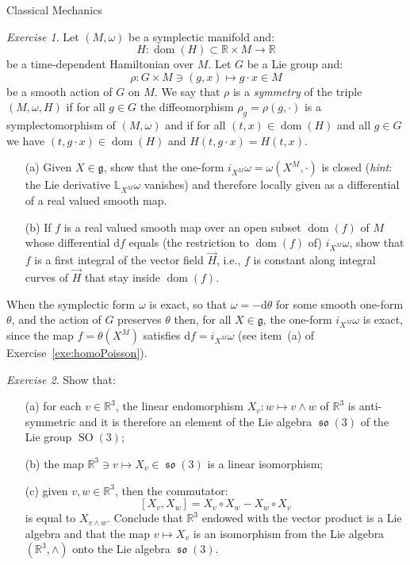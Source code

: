 \documentclass[oneside,a4paper,11pt]{amsbook}
\newcommand{\R}{\mathds R}
\newcommand{\dd}{\mathrm d}
\DeclareMathOperator{\SO}{SO}
\DeclareMathOperator{\so}{\mathfrak{so}}
\DeclareMathOperator{\Dom}{dom}
\theoremstyle{remark}\newtheorem{exercise}{Exercise}[chapter]
\theoremstyle{plain}\newtheorem{teo}{Theorem}[section]
\theoremstyle{plain}\newtheorem{lem}[teo]{Lemma}
\theoremstyle{plain}\newtheorem{prop}[teo]{Proposition}
\theoremstyle{plain}\newtheorem{cor}[teo]{Corollary}
\theoremstyle{definition}\newtheorem{defin}[teo]{Definition}
\theoremstyle{remark}\newtheorem{rem}[teo]{Remark}
\theoremstyle{definition}\newtheorem{notation}[teo]{Notation}
\theoremstyle{definition}\newtheorem{convention}[teo]{Convention}
\theoremstyle{definition}\newtheorem{example}[teo]{Example}
\numberwithin{section}{chapter}
\numberwithin{equation}{section}
\begin{document}
\begin{chapter}{Classical Mechanics}
\begin{exercise}\label{exe:Nother}
Let $(M,\omega)$ be a symplectic manifold and:
\[H:\Dom(H)\subset\R\times M\longrightarrow\R\]
be a time-dependent Hamiltonian over $M$. Let $G$ be a Lie group
and:
\[\rho:G\times M\ni(g,x)\longmapsto g\cdot x\in M\]
be a smooth action of $G$ on $M$. We say that $\rho$ is a {\em symmetry\/} of the triple $(M,\omega,H)$ if for
all $g\in G$ the diffeomorphism $\rho_g=\rho(g,\cdot)$ is a symplectomorphism of $(M,\omega)$ and if for all $(t,x)\in\Dom(H)$ and all $g\in G$ we have
$(t,g\cdot x)\in\Dom(H)$ and $H(t,g\cdot x)=H(t,x)$.
\begin{itemize}
\item[(a)] Given $X\in\mathfrak g$, show that the one-form $i_{X^{\!M}}\omega=\omega(X^{\!M},\cdot)$ is closed
({\em hint}: the Lie derivative $\mathbb L_{X^{\!M}}\omega$ vanishes)
and therefore locally given as a differential of a real valued smooth map.
\item[(b)] If $f$ is a real valued smooth map over an open subset $\Dom(f)$ of $M$ whose differential $\dd f$ equals (the restriction to $\Dom(f)$ of)
$i_{X^{\!M}}\omega$, show that $f$ is a first integral of the vector field
$\vec H$, i.e., $f$ is constant along integral curves of $\vec H$ that stay inside $\Dom(f)$.
\end{itemize}
When the symplectic form $\omega$ is exact, so that $\omega=-\dd\theta$ for some smooth one-form $\theta$, and the action of $G$ preserves $\theta$ then,
for all $X\in\mathfrak g$, the one-form $i_{X^{\!M}}\omega$ is exact, since the map $f=\theta(X^{\!M})$ satisfies $\dd f=i_{X^{\!M}}\omega$
(see item~(a) of Exercise~\ref{exe:homoPoisson}).
\end{exercise}

\begin{exercise}\label{exa:vecproduct}
Show that:
\begin{itemize}
\item[(a)] for each $v\in\R^3$, the linear endomorphism $X_v:w\mapsto v\wedge w$ of $\R^3$ is anti-symmetric and it is therefore an element
of the Lie algebra $\so(3)$ of the Lie group $\SO(3)$;
\item[(b)] the map $\R^3\ni v\mapsto X_v\in\so(3)$ is a linear isomorphism;
\item[(c)] given $v,w\in\R^3$, then the commutator:
\[[X_v,X_w]=X_v\circ X_w-X_w\circ X_v\]
is equal to $X_{v\wedge w}$. Conclude that $\R^3$ endowed with the vector product is a Lie algebra and that the map $v\mapsto X_v$ is an isomorphism
from the Lie algebra $(\R^3,{\wedge})$ onto the Lie algebra $\so(3)$.
\end{itemize}
\end{exercise}


\end{chapter}
\end{document}
